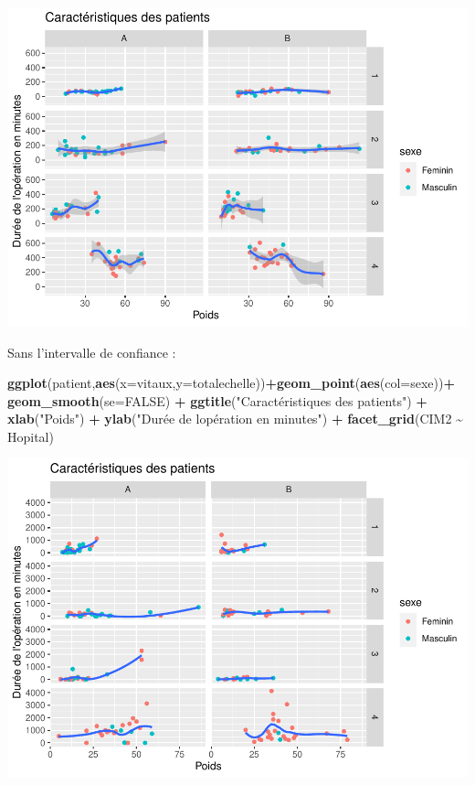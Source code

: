 \documentclass[
]{book}
\newenvironment{Shaded}{\begin{snugshade}}{\end{snugshade}}
\newcommand{\AttributeTok}[1]{\textcolor[rgb]{0.13,0.29,0.53}{#1}}
\newcommand{\ConstantTok}[1]{\textcolor[rgb]{0.56,0.35,0.01}{#1}}
\newcommand{\FunctionTok}[1]{\textcolor[rgb]{0.13,0.29,0.53}{\textbf{#1}}}
\newcommand{\NormalTok}[1]{#1}
\newcommand{\SpecialCharTok}[1]{\textcolor[rgb]{0.81,0.36,0.00}{\textbf{#1}}}
\newcommand{\StringTok}[1]{\textcolor[rgb]{0.31,0.60,0.02}{#1}}
\begin{document}
\includegraphics{_main_files/figure-latex/ggplot18-1.pdf}

Sans l'intervalle de confiance :

\begin{Shaded}
\begin{Highlighting}[]
\FunctionTok{ggplot}\NormalTok{(patient,}\FunctionTok{aes}\NormalTok{(}\AttributeTok{x=}\NormalTok{vitaux,}\AttributeTok{y=}\NormalTok{totalechelle))}\SpecialCharTok{+}\FunctionTok{geom\_point}\NormalTok{(}\FunctionTok{aes}\NormalTok{(}\AttributeTok{col=}\NormalTok{sexe))}\SpecialCharTok{+}
  \FunctionTok{geom\_smooth}\NormalTok{(}\AttributeTok{se=}\ConstantTok{FALSE}\NormalTok{) }\SpecialCharTok{+}
  \FunctionTok{ggtitle}\NormalTok{(}\StringTok{"Caractéristiques des patients"}\NormalTok{) }\SpecialCharTok{+} 
  \FunctionTok{xlab}\NormalTok{(}\StringTok{"Poids"}\NormalTok{) }\SpecialCharTok{+} 
  \FunctionTok{ylab}\NormalTok{(}\StringTok{"Durée de l\textquotesingle{}opération en minutes"}\NormalTok{) }\SpecialCharTok{+}
  \FunctionTok{facet\_grid}\NormalTok{(CIM2 }\SpecialCharTok{\textasciitilde{}}\NormalTok{ Hopital)}
\end{Highlighting}
\end{Shaded}

\includegraphics{_main_files/figure-latex/ggplot19-1.pdf}
\end{document}
